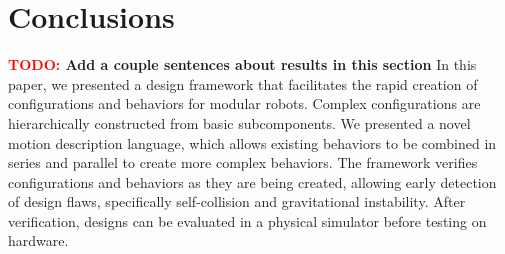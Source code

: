 \documentclass[graybox]{svmult}
\newcommand{\TODO}[1]{ {\bf \textcolor{red}{TODO:} #1 }}
\begin{document}
% 
%   
\section{Conclusions}
\TODO{Add a couple sentences about results in this section}
In this paper, we presented a design framework that facilitates the rapid creation
of configurations and behaviors for modular robots.
Complex configurations  are hierarchically constructed from basic
subcomponents.
We presented a novel motion description language, which allows existing behaviors
to be combined in series and parallel  to create more complex  behaviors.
The framework verifies  configurations and behaviors as they are being created, allowing
early detection of  design flaws, specifically self-collision and gravitational instability. After
verification, designs can be evaluated in a physical simulator before testing on
hardware.
\end{document}
